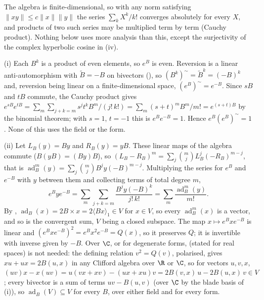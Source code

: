 The algebra is finite-dimensional, so with any norm satisfying $\lVert xy \rVert \le c \lVert x \rVert \lVert y \rVert$ the series $\sum_k X^{k}/k!$ converges absolutely for every $X$, and products of two such series may be multiplied term by term (Cauchy product). Nothing below uses more analysis than this, except the surjectivity of the complex hyperbolic cosine in (iv).

(i) Each $B^{k}$ is a product of even elements, so $e^{B}$ is even. Reversion is a linear anti-automorphism with $\tilde B = -B$ on bivectors (), so $(B^{k})^{\sim} = \tilde B^{k} = (-B)^{k}$ and, reversion being linear on a finite-dimensional space, $(e^{B})^{\sim} = e^{-B}$. Since $sB$ and $tB$ commute, the Cauchy product gives $e^{sB} e^{tB} = \sum_m \sum_{j + k = m} s^{j} t^{k} B^{m}/(j!\,k!) = \sum_m (s + t)^{m} B^{m}/m! = e^{(s+t)B}$ by the binomial theorem; with $s = 1$, $t = -1$ this is $e^{B}e^{-B} = 1$. Hence $e^{B}(e^{B})^{\sim} = 1$. None of this uses the field or the form.

(ii) Let $L_B(y) = By$ and $R_B(y) = yB$. These linear maps of the algebra commute ($B(yB) = (By)B$), so $(L_B - R_B)^{m} = \sum_{j} \binom{m}{j} L_B^{j}(-R_B)^{m-j}$, that is $\operatorname{ad}_B^{m}(y) = \sum_j \binom{m}{j} B^{j} y (-B)^{m-j}$. Multiplying the series for $e^{B}$ and $e^{-B}$ with $y$ between them and collecting terms of total degree $m$,
\[
e^{B} y e^{-B} = \sum_{m} \sum_{j + k = m} \frac{B^{j} y (-B)^{k}}{j!\,k!} = \sum_m \frac{\operatorname{ad}_B^{m}(y)}{m!} .
\]
By , $\operatorname{ad}_B(x) = 2 B \times x = 2\langle Bx \rangle_1 \in V$ for $x \in V$, so every $\operatorname{ad}_B^{m}(x)$ is a vector, and so is the convergent sum, $V$ being a closed subspace. The map $x \mapsto e^{B} x e^{-B}$ is linear and $(e^{B} x e^{-B})^{2} = e^{B} x^{2} e^{-B} = Q(x)$, so it preserves $Q$; it is invertible with inverse given by $-B$. Over $\C$, or for degenerate forms,  (stated for real spaces) is not needed: the defining relation $v^{2} = Q(v)$, polarised, gives $xu + ux = 2B(u, x)$ in any Clifford algebra over $\R$ or $\C$, so for vectors $u, v, x$, $(uv)x - x(uv) = u(vx + xv) - (ux + xu)v = 2B(v, x)\,u - 2B(u, x)\,v \in V$; every bivector is a sum of terms $uv - B(u, v)$ (over $\C$ by the blade basis of (i)), so $\operatorname{ad}_B(V) \subseteq V$ for every $B$, over either field and for every form.

